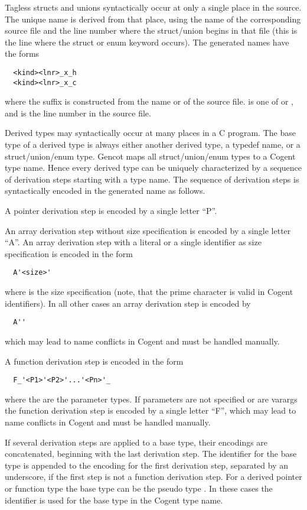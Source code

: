 Tagless structs and unions syntactically occur at only a single place in the source. The unique name is derived from 
that place, using the name of the corresponding source file and the line number where the struct/union begins
in that file (this is the line where the struct or enum keyword occurs).
The generated names have the forms
\begin{verbatim}
  <kind><lnr>_x_h
  <kind><lnr>_x_c
\end{verbatim}
where the suffix is constructed from the name  or  of the source file.  is one of
 or , and  is the line number in the source file.

Derived types may syntactically occur at many places in a C program. The base type of a derived
type is always either another derived type, a typedef name, or a struct/union/enum type. Gencot maps all
struct/union/enum types to a Cogent type name. Hence every derived type can be uniquely characterized by a sequence
of derivation steps starting with a type name. The sequence of derivation steps is syntactically encoded in the 
generated name as follows.

A pointer derivation step is encoded by a single letter ``P''. 

An array derivation step without size
specification is encoded by a single letter ``A''. An array derivation step with a literal or a single identifier
as size specification is encoded in the form
\begin{verbatim}
  A'<size>'
\end{verbatim}
where  is the size specification (note, that the prime character is valid in Cogent identifiers). 
In all other cases an array derivation step is encoded by
\begin{verbatim}
  A''
\end{verbatim}
which may lead to name conflicts in Cogent and must be handled manually.

A function derivation step is encoded in the form
\begin{verbatim}
  F_'<P1>'<P2>'...'<Pn>'_
\end{verbatim}
where the  are the parameter types. If parameters are not specified or are varargs the function
derivation step is encoded by a single letter ``F'', which may lead to name conflicts in Cogent and must 
be handled manually.

If several derivation steps are applied to a base type, their encodings are concatenated, beginning with the 
last derivation step. The identifier for the base type is appended to the encoding for the first derivation step,
separated by an underscore, if the first step is not a function derivation step. For a derived pointer or 
function type the base type can be the pseudo type . In these cases the identifier  is
used for the base type in the Cogent type name.

